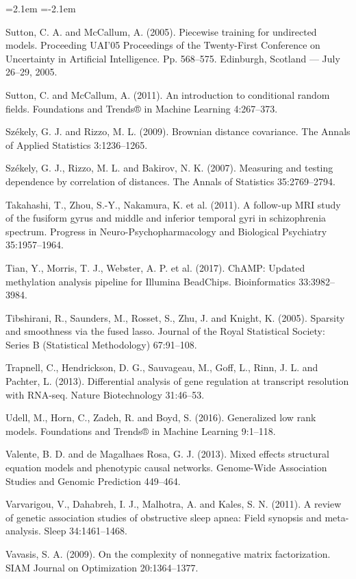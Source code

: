 \begin{list}{}{\leftmargin=2.1em  
  \itemindent=-2.1em \parsep=0pt \itemsep=2pt \topsep=0pt}
\item Sutton, C. A. and McCallum, A. (2005). Piecewise training for undirected models. Proceeding UAI'05 Proceedings of the Twenty-First Conference on Uncertainty in Artificial Intelligence. Pp. 568--575. Edinburgh, Scotland --- July 26--29, 2005.
\item Sutton, C. and McCallum, A. (2011). An introduction to conditional random fields. Foundations and Trends® in Machine Learning 4:267--373.
\item Székely, G. J. and Rizzo, M. L. (2009). Brownian distance covariance. The Annals of Applied Statistics 3:1236--1265.
\item Székely, G. J., Rizzo, M. L. and Bakirov, N. K. (2007). Measuring and testing dependence by correlation of distances. The Annals of Statistics 35:2769--2794.
\item Takahashi, T., Zhou, S.-Y., Nakamura, K. et al. (2011). A follow-up MRI study of the fusiform gyrus and middle and inferior temporal gyri in schizophrenia spectrum. Progress in Neuro-Psychopharmacology and Biological Psychiatry 35:1957--1964.
\item Tian, Y., Morris, T. J., Webster, A. P. et al. (2017). ChAMP: Updated methylation analysis pipeline for Illumina BeadChips. Bioinformatics 33:3982--3984.
\item Tibshirani, R., Saunders, M., Rosset, S., Zhu, J. and Knight, K. (2005). Sparsity and smoothness via the fused lasso. Journal of the Royal Statistical Society: Series B (Statistical Methodology) 67:91--108.
\item Trapnell, C., Hendrickson, D. G., Sauvageau, M., Goff, L., Rinn, J. L. and Pachter, L. (2013). Differential analysis of gene regulation at transcript resolution with RNA-seq. Nature Biotechnology 31:46--53.
\item Udell, M., Horn, C., Zadeh, R. and Boyd, S. (2016). Generalized low rank models. Foundations and Trends® in Machine Learning 9:1--118.
\item Valente, B. D. and de Magalhaes Rosa, G. J. (2013). Mixed effects structural equation models and phenotypic causal networks. Genome-Wide Association Studies and Genomic Prediction 449--464.
\item Varvarigou, V., Dahabreh, I. J., Malhotra, A. and Kales, S. N. (2011). A review of genetic association studies of obstructive sleep apnea: Field synopsis and meta-analysis. Sleep 34:1461--1468.
\item Vavasis, S. A. (2009). On the complexity of nonnegative matrix factorization. SIAM Journal on Optimization 20:1364--1377.

\end{list}
